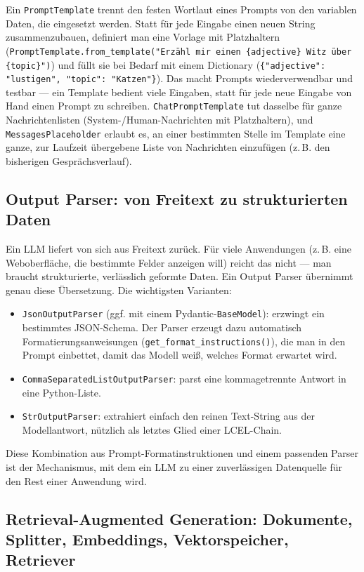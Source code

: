 Ein \texttt{PromptTemplate} trennt den festen Wortlaut eines Prompts von den variablen
Daten, die eingesetzt werden. Statt für jede Eingabe einen neuen String
zusammenzubauen, definiert man eine Vorlage mit Platzhaltern
(\lstinline|PromptTemplate.from_template("Erzähl mir einen {adjective} Witz über {topic}")|)
und füllt sie bei Bedarf mit einem Dictionary
(\lstinline|{"adjective": "lustigen", "topic": "Katzen"}|). Das macht Prompts
wiederverwendbar und testbar --- ein Template bedient viele Eingaben, statt für jede neue
Eingabe von Hand einen Prompt zu schreiben. \texttt{ChatPromptTemplate} tut dasselbe für
ganze Nachrichtenlisten (System-/Human-Nachrichten mit Platzhaltern), und
\texttt{MessagesPlaceholder} erlaubt es, an einer bestimmten Stelle im Template eine
ganze, zur Laufzeit übergebene Liste von Nachrichten einzufügen (z.\,B. den bisherigen
Gesprächsverlauf).

\subsection{Output Parser: von Freitext zu strukturierten Daten}

Ein LLM liefert von sich aus Freitext zurück. Für viele Anwendungen (z.\,B. eine
Weboberfläche, die bestimmte Felder anzeigen will) reicht das nicht --- man braucht
strukturierte, verlässlich geformte Daten. Ein Output Parser übernimmt genau diese
Übersetzung. Die wichtigsten Varianten:
\begin{itemize}
    \item \texttt{JsonOutputParser} (ggf. mit einem Pydantic-\texttt{BaseModel}): erzwingt
          ein bestimmtes JSON-Schema. Der Parser erzeugt dazu automatisch
          Formatierungsanweisungen (\texttt{get\_format\_instructions()}), die man in den
          Prompt einbettet, damit das Modell weiß, welches Format erwartet wird.
    \item \texttt{CommaSeparatedListOutputParser}: parst eine kommagetrennte Antwort in
          eine Python-Liste.
    \item \texttt{StrOutputParser}: extrahiert einfach den reinen Text-String aus der
          Modellantwort, nützlich als letztes Glied einer LCEL-Chain.
\end{itemize}
Diese Kombination aus Prompt-Formatinstruktionen und einem passenden Parser ist der
Mechanismus, mit dem ein LLM zu einer zuverlässigen Datenquelle für den Rest einer
Anwendung wird.

\subsection{Retrieval-Augmented Generation: Dokumente, Splitter, Embeddings, Vektorspeicher, Retriever}

